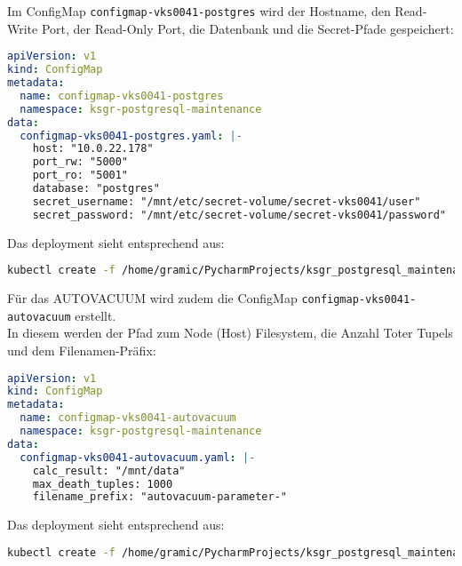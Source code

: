 \begin{flushleft}
    Im ConfigMap \texttt{configmap-vks0041-postgres} wird der Hostname, den Read-Write Port, der Read-Only Port, die Datenbank und die Secret-Pfade gespeichert:
    \lstset{style=gra_codestyle}
    \begin{lstlisting}[language=yaml, caption=Maintenance-Tool - \Gls{AUTOVACUUM} - configmap-vks0041-postgres,captionpos=b,label={lst:maintenannce-tool-autovacuum-configmap-vks0041-postgres},breaklines=true]
apiVersion: v1
kind: ConfigMap
metadata:
  name: configmap-vks0041-postgres
  namespace: ksgr-postgresql-maintenance
data:
  configmap-vks0041-postgres.yaml: |-
    host: "10.0.22.178"
    port_rw: "5000"
    port_ro: "5001"
    database: "postgres"
    secret_username: "/mnt/etc/secret-volume/secret-vks0041/user"
    secret_password: "/mnt/etc/secret-volume/secret-vks0041/password"
    \end{lstlisting}
    Das deployment sieht entsprechend aus:
    \lstset{style=gra_codestyle}
    \begin{lstlisting}[language=bash, caption=Maintenance-Tool - \Gls{AUTOVACUUM} - configmap-vks0041-postgres Deploy,captionpos=b,label={lst:maintenannce-tool-configmap-vks0041-postgres-deploy},breaklines=true]
kubectl create -f /home/gramic/PycharmProjects/ksgr_postgresql_maintenance/configmap-vks0041-postgres.yaml
    \end{lstlisting}
    Für das \Gls{AUTOVACUUM} wird zudem die ConfigMap \texttt{configmap-vks0041-autovacuum} erstellt.\\
    In diesem werden der Pfad zum Node (Host) Filesystem, die Anzahl Toter Tupels und dem Filenamen-Präfix:
    \lstset{style=gra_codestyle}
    \begin{lstlisting}[language=yaml, caption=Maintenance-Tool - \Gls{AUTOVACUUM} - configmap-vks0041-autovacuum,captionpos=b,label={lst:maintenannce-tool-autovacuum-configmap-vks0041-autovacuum},breaklines=true]
apiVersion: v1
kind: ConfigMap
metadata:
  name: configmap-vks0041-autovacuum
  namespace: ksgr-postgresql-maintenance
data:
  configmap-vks0041-autovacuum.yaml: |-
    calc_result: "/mnt/data"
    max_death_tuples: 1000
    filename_prefix: "autovacuum-parameter-"
    \end{lstlisting}
    Das deployment sieht entsprechend aus:
    \lstset{style=gra_codestyle}
    \begin{lstlisting}[language=bash, caption=Maintenance-Tool - \Gls{AUTOVACUUM} - configmap-vks0041-autovacuum Deploy,captionpos=b,label={lst:maintenannce-tool-configmap-vks0041-autovacuum-deploy},breaklines=true]
kubectl create -f /home/gramic/PycharmProjects/ksgr_postgresql_maintenance/configmap-vks0041-autovacuum.yaml
    \end{lstlisting}
\end{flushleft}
